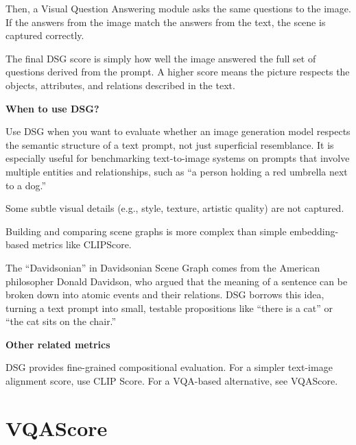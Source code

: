 Then, a Visual Question Answering module asks the same questions to the image. If the answers from the image match the answers from the text,
the scene is captured correctly.

The final DSG score is simply how well the image answered the full set of questions derived from the prompt. A higher score means the picture
respects the objects, attributes, and relations described in the text.


\textbf{When to use DSG?}

Use DSG when you want to evaluate whether an image generation model respects the semantic structure of a text prompt, not just
superficial resemblance. It is especially useful for benchmarking text-to-image systems on prompts that involve multiple entities and
relationships, such as “a person holding a red umbrella next to a dog.”

{
\item Some subtle visual details (e.g., style, texture, artistic quality) are not captured.
\item Building and comparing scene graphs is more complex than simple embedding-based metrics like CLIPScore.
}


\clearpage

\thispagestyle{customstyle}

{The “Davidsonian” in Davidsonian Scene Graph comes from the American philosopher Donald Davidson, who argued that the meaning of a sentence can
be broken down into atomic events and their relations. DSG borrows this idea, turning a text prompt into small, testable propositions like
“there is a cat” or “the cat sits on the chair.”}

\textbf{Other related metrics}

DSG provides fine-grained compositional evaluation. For a simpler text-image alignment score, use CLIP Score.
For a VQA-based alternative, see VQAScore.

\clearpage
\thispagestyle{genaistyle}
\section{VQAScore}
